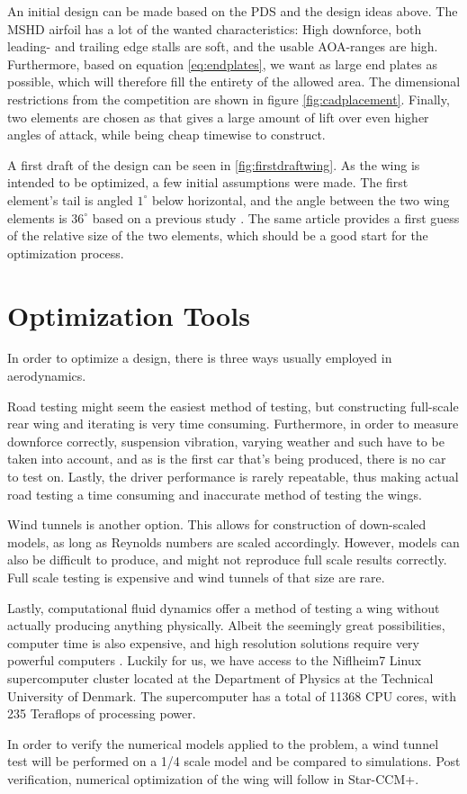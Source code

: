     An initial design can be made based on the PDS and the design ideas above. The MSHD airfoil has a lot of the wanted characteristics: High downforce, both leading- and trailing edge stalls are soft, and the usable AOA-ranges are high. Furthermore, based on equation \ref{eq:endplates}, we want as large end plates as possible, which will therefore fill the entirety of the allowed area. The dimensional restrictions from the competition are shown in figure \ref{fig:cadplacement}. Finally, two elements are chosen as that gives a large amount of lift over even higher angles of attack, while being cheap timewise to construct.

    A first draft of the design can be seen in \ref{fig:firstdraftwing}. As the wing is intended to be optimized, a few initial assumptions were made. The first element's tail is angled $1^\circ$ below horizontal, and the angle between the two wing elements is $36^\circ$ based on a previous study \cite{winginitialangle}. The same article provides a first guess of the relative size of the two elements, which should be a good start for the optimization process.

  \section{Optimization Tools}

    In order to optimize a design, there is three ways usually employed in aerodynamics.

    Road testing might seem the easiest method of testing, but constructing full-scale rear wing and iterating is very time consuming. Furthermore, in order to measure downforce correctly, suspension vibration, varying weather and such have to be taken into account, and as is the first car that's being produced, there is no car to test on. Lastly, the driver performance is rarely repeatable, thus making actual road testing a time consuming and inaccurate method of testing the wings.

    Wind tunnels is another option. This allows for construction of down-scaled models, as long as Reynolds numbers are scaled accordingly. However, models can also be difficult to produce, and might not reproduce full scale results correctly. Full scale testing is expensive and wind tunnels of that size are rare.

    Lastly, computational fluid dynamics offer a method of testing a wing without actually producing anything physically. Albeit the seemingly great possibilities, computer time is also expensive, and high resolution solutions require very powerful computers \cite{jkatz}. Luckily for us, we have access to the Niflheim7 Linux supercomputer cluster located at the Department of Physics at the Technical University of Denmark. The supercomputer has a total of 11368 CPU cores, with 235 Teraflops of processing power.

    In order to verify the numerical models applied to the problem, a wind tunnel test will be performed on a 1/4 scale model and be compared to simulations. Post verification, numerical optimization of the wing will follow in Star-CCM+.
